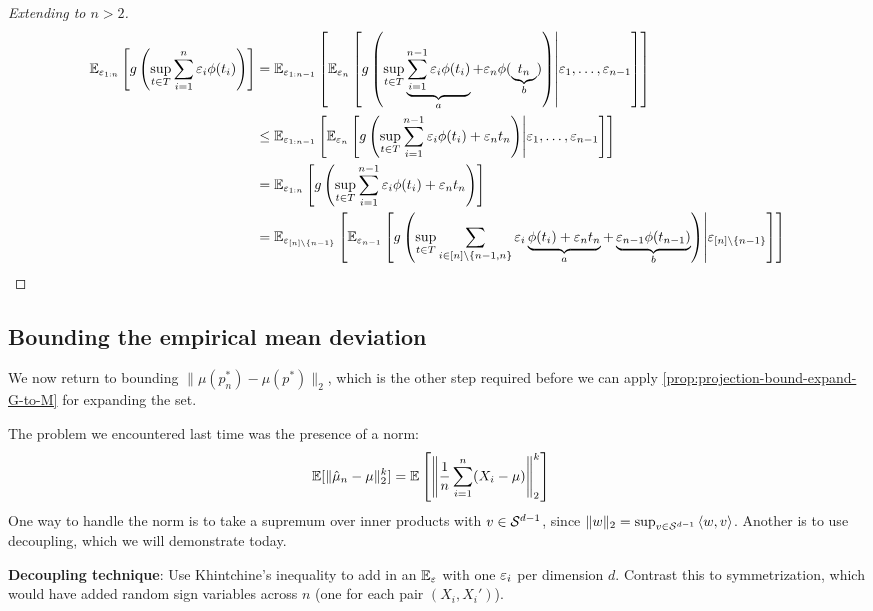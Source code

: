 \begin{proof}[Extending to $n > 2$]
  \begin{align}
    \mathbb{E}_{\varepsilon_{1:n}}\left[
      g \left(
        \sup_{t \in T} \sum_{i=1}^n \varepsilon_i \phi(t_i)
      \right)
    \right]
    &=
    \mathbb{E}_{\varepsilon_{1:n-1}} \left[
      \mathbb{E}_{\varepsilon_{n}}\left[
        g \left(
          \sup_{t \in T} \underbrace{\sum_{i=1}^{n-1} \varepsilon_i \phi(t_i)}_{a} + \varepsilon_n \phi(\underbrace{t_n}_{b})
        \right)
      \middle\vert \varepsilon_1,\ldots, \varepsilon_{n-1} \right]
    \right] \\
    &\leq
    \mathbb{E}_{\varepsilon_{1:n-1}} \left[
      \mathbb{E}_{\varepsilon_{n}}\left[
        g \left(
          \sup_{t \in T} \sum_{i=1}^{n-1} \varepsilon_i \phi(t_i) + \varepsilon_n t_n
        \right)
      \middle\vert \varepsilon_1,\ldots, \varepsilon_{n-1} \right]
    \right] \\
    &=
    \mathbb{E}_{\varepsilon_{1:n}} \left[
      g \left(
        \sup_{t \in T} \sum_{i=1}^{n-1} \varepsilon_i \phi(t_i) + \varepsilon_n t_n
      \right)
    \right] \\
    &=
    \mathbb{E}_{\varepsilon_{[n] \setminus \{n-1\}}} \left[
        \mathbb{E}_{\varepsilon_{n-1}}\left[
          g \left(
            \sup_{t \in T} \sum_{i \in [n] \setminus \{n-1, n\}} \varepsilon_i \underbrace{\phi(t_i) + \varepsilon_n t_n }_{a}
            + \underbrace{\varepsilon_{n-1} \phi(t_{n-1})}_{b}
          \right)
        \middle\lvert \varepsilon_{[n] \setminus \{n-1\}} \right]
      \right]
  \end{align}
\end{proof}


\subsection{Bounding the empirical mean deviation}

We now return to bounding $\|\mu(p_n^*) - \mu(p^*)\|_2$, which is the other
step required before we can apply \cref{prop:projection-bound-expand-G-to-M}
for expanding the set.

The problem we encountered last time was the presence of a norm:
\begin{align}
  \mathbb{E}[ \|\hat{\mu}_n - \mu\|_2^k ]
  &= \mathbb{E} \left[ \left\| \frac{1}{n} \sum_{i=1}^n (X_i - \mu)\right\|_2^k \right]
\end{align}
One way to handle the norm is to take a supremum over inner products with
$v \in \mathcal{S}^{d-1}$, since $\|w\|_2 = \sup_{v \in \mathcal{S}^{d-1}} \braket{w,v}$.
Another is to use decoupling, which we will demonstrate today.

\textbf{Decoupling technique}: Use Khintchine's inequality to add in
an $\mathbb{E}_\varepsilon$ with one $\varepsilon_i$ per dimension $d$.
Contrast this to symmetrization, which would have added random sign variables
across $n$ (one for each pair $(X_i, X_i')$).


